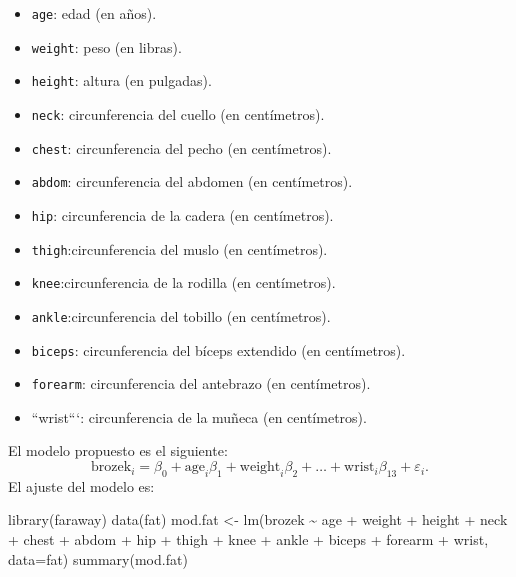 \documentclass[
]{article}
\newenvironment{Shaded}{\begin{snugshade}}{\end{snugshade}}
\newcommand{\AttributeTok}[1]{\textcolor[rgb]{0.77,0.63,0.00}{#1}}
\newcommand{\FunctionTok}[1]{\textcolor[rgb]{0.00,0.00,0.00}{#1}}
\newcommand{\NormalTok}[1]{#1}
\newcommand{\OtherTok}[1]{\textcolor[rgb]{0.56,0.35,0.01}{#1}}
\newcommand{\SpecialCharTok}[1]{\textcolor[rgb]{0.00,0.00,0.00}{#1}}
\begin{document}
\begin{itemize}
\item
  \texttt{age}: edad (en años).
\item
  \texttt{weight}: peso (en libras).
\item
  \texttt{height}: altura (en pulgadas).
\item
  \texttt{neck}: circunferencia del cuello (en centímetros).
\item
  \texttt{chest}: circunferencia del pecho (en centímetros).
\item
  \texttt{abdom}: circunferencia del abdomen (en centímetros).
\item
  \texttt{hip}: circunferencia de la cadera (en centímetros).
\item
  \texttt{thigh}:circunferencia del muslo (en centímetros).
\item
  \texttt{knee}:circunferencia de la rodilla (en centímetros).
\item
  \texttt{ankle}:circunferencia del tobillo (en centímetros).
\item
  \texttt{biceps}: circunferencia del bíceps extendido (en centímetros).
\item
  \texttt{forearm}: circunferencia del antebrazo (en centímetros).
\item
  ``wrist```: circunferencia de la muñeca (en centímetros).
\end{itemize}

El modelo propuesto es el siguiente:
\[
\mbox{brozek}_i = \beta_{0} + \mbox{age}_i\beta_1+ \mbox{weight}_i\beta_2 + \ldots + \mbox{wrist}_i\beta_{13}  + \varepsilon_i.
\]
El ajuste del modelo es:

\begin{Shaded}
\begin{Highlighting}[]
\FunctionTok{library}\NormalTok{(faraway)}
\FunctionTok{data}\NormalTok{(fat)}
\NormalTok{mod.fat }\OtherTok{\textless{}{-}} \FunctionTok{lm}\NormalTok{(brozek }\SpecialCharTok{\textasciitilde{}}\NormalTok{ age }\SpecialCharTok{+}\NormalTok{ weight }\SpecialCharTok{+}\NormalTok{ height }\SpecialCharTok{+}\NormalTok{ neck }\SpecialCharTok{+}\NormalTok{ chest }\SpecialCharTok{+}\NormalTok{ abdom }\SpecialCharTok{+}
\NormalTok{             hip }\SpecialCharTok{+}\NormalTok{ thigh }\SpecialCharTok{+}\NormalTok{ knee }\SpecialCharTok{+}\NormalTok{ ankle }\SpecialCharTok{+}\NormalTok{ biceps }\SpecialCharTok{+}\NormalTok{ forearm }\SpecialCharTok{+}\NormalTok{ wrist, }\AttributeTok{data=}\NormalTok{fat)}
\FunctionTok{summary}\NormalTok{(mod.fat)}
\end{Highlighting}
\end{Shaded}
\end{document}

